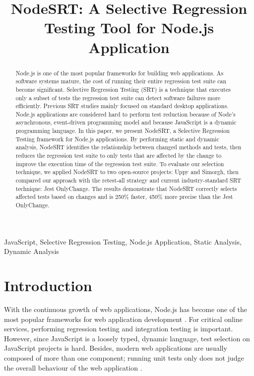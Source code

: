 \documentclass[10pt, conference]{IEEEtran}
\begin{document}
\title{NodeSRT: A Selective Regression Testing Tool for Node.js Application}

\author{
}

\maketitle

\begin{abstract}
Node.js is one of the most popular frameworks for building web applications. As software systems 
mature, the cost of running their entire regression test suite can become significant. 
Selective Regression Testing (SRT) is a technique that executes only a subset of tests the regression test suite can detect software failures more efficiently. 
Previous SRT studies mainly focused on standard desktop applications. Node.js applications are 
considered hard to perform test reduction because of Node's asynchronous, event-driven programming model and because  
JavaScript is a dynamic programming language. 
In this paper, we present NodeSRT, a Selective Regression Testing framework for Node.js applications. 
By performing static and dynamic analysis, NodeSRT identifies the relationship between changed methods and tests, 
then reduces the regression test suite to only tests that are 
affected by the change to improve the execution time of the regression test suite. 
To evaluate our selection technique, we applied NodeSRT to two open-source projects: Uppy and Simorgh, 
then compared our approach with the retest-all strategy and current industry-standard SRT technique: Jest 
OnlyChange. The results demonstrate that NodeSRT correctly selects affected tests based on 
changes and is 250\% faster, 450\% more precise than the Jest OnlyChange. 
    
\end{abstract}

\begin{IEEEkeywords}
JavaScript, Selective Regression Testing, Node.js Application, Static Analysis, Dynamic Analysis
\end{IEEEkeywords}

\section{Introduction}
With the continuous growth of web applications, Node.js has become one of the most popular frameworks 
for web application development \cite{b16}. For critical online services, performing regression testing and integration testing is important. However, 
since JavaScript is a loosely typed, dynamic language, test 
selection on JavaScript projects is hard. Besides, modern web applications are usually composed of 
more than one component; running unit tests only does not judge the overall behaviour of the web 
application \cite{b8}. 
\end{document}
